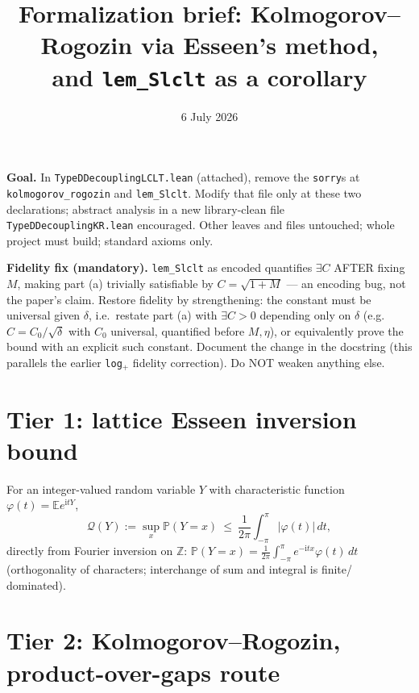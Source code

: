 \documentclass[11pt]{article}
\title{Formalization brief: Kolmogorov--Rogozin via Esseen's method,\\
and \texttt{lem\_Slclt} as a corollary}
\date{6 July 2026}
\theoremstyle{plain}
\theoremstyle{remark}
\newcommand{\E}{\mathbb{E}}\newcommand{\PP}{\mathbb{P}}\newcommand{\R}{\mathbb{R}}\newcommand{\Z}{\mathbb{Z}}
\newcommand{\Q}{\mathcal Q}
\begin{document}
\maketitle

\noindent\textbf{Goal.} In \texttt{TypeDDecouplingLCLT.lean} (attached), remove
the \texttt{sorry}s at \texttt{kolmogorov\_rogozin} and \texttt{lem\_Slclt}.
Modify that file only at these two declarations; abstract analysis in a new
library-clean file \texttt{TypeDDecouplingKR.lean} encouraged. Other leaves and
files untouched; whole project must build; standard axioms only.

\textbf{Fidelity fix (mandatory).} \texttt{lem\_Slclt} as encoded quantifies
$\exists C$ AFTER fixing $M$, making part (a) trivially satisfiable by
$C=\sqrt{1+M}$ --- an encoding bug, not the paper's claim. Restore fidelity by
strengthening: the constant must be universal given $\delta$, i.e.\ restate
part (a) with $\exists C>0$ depending only on $\delta$ (e.g.\
$C=C_0/\sqrt\delta$ with $C_0$ universal, quantified before $M,\eta$), or
equivalently prove the bound with an explicit such constant. Document the
change in the docstring (this parallels the earlier \texttt{log}$_+$ fidelity
correction). Do NOT weaken anything else.

\section*{Tier 1: lattice Esseen inversion bound}

For an integer-valued random variable $Y$ with characteristic function
$\varphi(t)=\E e^{\mathrm itY}$,
\[
  \Q(Y):=\sup_x\PP(Y=x)\ \le\ \frac1{2\pi}\int_{-\pi}^{\pi}|\varphi(t)|\,dt,
\]
directly from Fourier inversion on $\Z$:
$\PP(Y=x)=\frac1{2\pi}\int_{-\pi}^{\pi}e^{-\mathrm itx}\varphi(t)\,dt$
(orthogonality of characters; interchange of sum and integral is finite/
dominated).

\section*{Tier 2: Kolmogorov--Rogozin, product-over-gaps route}
\end{document}
